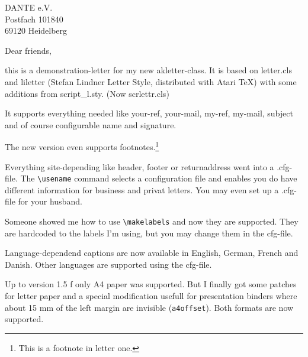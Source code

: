 \documentclass[%
foldmarks,
bankhigh,
banklow,
draft,
refdate,
twoside,
a4paper]
{akletter}
\begin{document}
\begin{letter}{DANTE e.V.\\Postfach 101840\\69120 Heidelberg}
\renewcommand*\pnumfont   {\bfseries}
\renewcommand*\headfont   {\slshape} 
\renewcommand*\reffont    {\normalfont}
\renewcommand*\reftextfont{\normalfont}
\pagestyle{headings} %
\subject{LaTeX2e Letter-style}
\opening{Dear friends,}
%
this is a demonstration-letter for my new akletter-class. It is 
based on letter.cls and liletter (Stefan Lindner Letter Style, 
distributed with Atari \TeX) with some additions from 
script\_l.sty. (Now scrlettr.cls)

It supports everything needed like your-ref, your-mail, my-ref, 
my-mail, subject and of course configurable name and signature.

The new version even supports footnotes.\footnote{This is a footnote 
in letter one.}

Everything site-depending like header, footer or returnaddress 
went into a .cfg-file. The \verb|\usename| command selects a 
configuration file and enables you do have different 
information for business and privat letters. You may even set up 
a .cfg-file for your husband.

Someone showed me how to use \verb|\makelabels| and now they are 
supported. They are hardcoded to the labels I'm using, but you may 
change them in the cfg-file.

Language-dependend captions are now available in English, German, 
French and Danish. Other languages are supported using the cfg-file.

Up to version 1.5 f only A4 paper was supported. But I finally got 
some patches for letter paper and a special modification usefull for 
presentation binders where about 15 mm of the left margin are 
invisible (\texttt{a4offset}). Both formats are now supported.


\end{letter}
\end{document}
